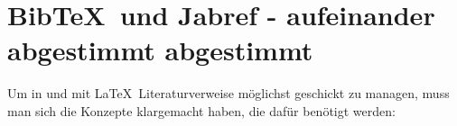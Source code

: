%
%
%
%
\section{Bib\TeX\ und Jabref - aufeinander abgestimmt abgestimmt}

Um in und mit \LaTeX\ Literaturverweise möglichst geschickt zu managen, muss man
sich die Konzepte klargemacht haben, die dafür benötigt werden:

